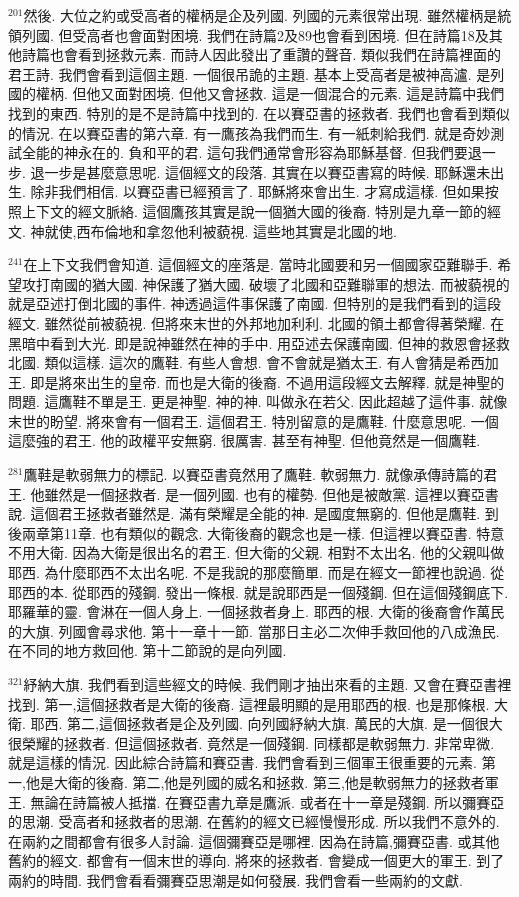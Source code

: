 \documentclass{book}
\begin{document}
$^{201}$然後.
大位之約或受高者的權柄是企及列國.
列國的元素很常出現.
雖然權柄是統領列國.
但受高者也會面對困境.
我們在詩篇2及89也會看到困境.
但在詩篇18及其他詩篇也會看到拯救元素.
而詩人因此發出了重讚的聲音.
類似我們在詩篇裡面的君王詩.
我們會看到這個主題.
一個很吊詭的主題.
基本上受高者是被神高瀘.
是列國的權柄.
但他又面對困境.
但他又會拯救.
這是一個混合的元素.
這是詩篇中我們找到的東西.
特別的是不是詩篇中找到的.
在以賽亞書的拯救者.
我們也會看到類似的情況.
在以賽亞書的第六章.
有一鷹孩為我們而生.
有一紙刺給我們.
就是奇妙測試全能的神永在的.
負和平的君.
這句我們通常會形容為耶穌基督.
但我們要退一步.
退一步是甚麼意思呢.
這個經文的段落.
其實在以賽亞書寫的時候.
耶穌還未出生.
除非我們相信.
以賽亞書已經預言了.
耶穌將來會出生.
才寫成這樣.
但如果按照上下文的經文脈絡.
這個鷹孩其實是說一個猶大國的後裔.
特別是九章一節的經文.
神就使,西布倫地和拿忽他利被藐視.
這些地其實是北國的地.

$^{241}$在上下文我們會知道.
這個經文的座落是.
當時北國要和另一個國家亞難聯手.
希望攻打南國的猶大國.
神保護了猶大國.
破壞了北國和亞難聯軍的想法.
而被藐視的就是亞述打倒北國的事件.
神透過這件事保護了南國.
但特別的是我們看到的這段經文.
雖然從前被藐視.
但將來末世的外邦地加利利.
北國的領土都會得著榮耀.
在黑暗中看到大光.
即是說神雖然在神的手中.
用亞述去保護南國.
但神的救恩會拯救北國.
類似這樣.
這次的鷹鞋.
有些人會想.
會不會就是猶太王.
有人會猜是希西加王.
即是將來出生的皇帝.
而也是大衛的後裔.
不過用這段經文去解釋.
就是神聖的問題.
這鷹鞋不單是王.
更是神聖.
神的神.
叫做永在若父.
因此超越了這件事.
就像末世的盼望.
將來會有一個君王.
這個君王.
特別留意的是鷹鞋.
什麼意思呢.
一個這麼強的君王.
他的政權平安無窮.
很厲害.
甚至有神聖.
但他竟然是一個鷹鞋.

$^{281}$鷹鞋是軟弱無力的標記.
以賽亞書竟然用了鷹鞋.
軟弱無力.
就像承傳詩篇的君王.
他雖然是一個拯救者.
是一個列國.
也有的權勢.
但他是被敵黨.
這裡以賽亞書說.
這個君王拯救者雖然是.
滿有榮耀是全能的神.
是國度無窮的.
但他是鷹鞋.
到後兩章第11章.
也有類似的觀念.
大衛後裔的觀念也是一樣.
但這裡以賽亞書.
特意不用大衛.
因為大衛是很出名的君王.
但大衛的父親.
相對不太出名.
他的父親叫做耶西.
為什麼耶西不太出名呢.
不是我說的那麼簡單.
而是在經文一節裡也說過.
從耶西的本.
從耶西的殘鋼.
發出一條根.
就是說耶西是一個殘鋼.
但在這個殘鋼底下.
耶羅華的靈.
會淋在一個人身上.
一個拯救者身上.
耶西的根.
大衛的後裔會作萬民的大旗.
列國會尋求他.
第十一章十一節.
當那日主必二次伸手救回他的八成漁民.
在不同的地方救回他.
第十二節說的是向列國.

$^{321}$紓納大旗.
我們看到這些經文的時候.
我們剛才抽出來看的主題.
又會在賽亞書裡找到.
第一,這個拯救者是大衛的後裔.
這裡最明顯的是用耶西的根.
也是那條根.
大衛.
耶西.
第二,這個拯救者是企及列國.
向列國紓納大旗.
萬民的大旗.
是一個很大很榮耀的拯救者.
但這個拯救者.
竟然是一個殘鋼.
同樣都是軟弱無力.
非常卑微.
就是這樣的情況.
因此綜合詩篇和賽亞書.
我們會看到三個軍王很重要的元素.
第一,他是大衛的後裔.
第二,他是列國的威名和拯救.
第三,他是軟弱無力的拯救者軍王.
無論在詩篇被人抵擋.
在賽亞書九章是鷹派.
或者在十一章是殘鋼.
所以彌賽亞的思潮.
受高者和拯救者的思潮.
在舊約的經文已經慢慢形成.
所以我們不意外的.
在兩約之間都會有很多人討論.
這個彌賽亞是哪裡.
因為在詩篇,彌賽亞書.
或其他舊約的經文.
都會有一個末世的導向.
將來的拯救者.
會變成一個更大的軍王.
到了兩約的時間.
我們會看看彌賽亞思潮是如何發展.
我們會看一些兩約的文獻.
\end{document}
